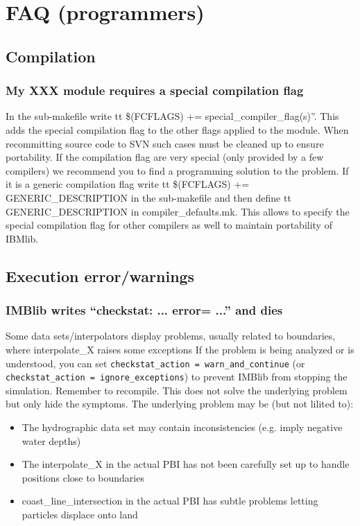 \chapter{FAQ (programmers)}

\section{Compilation}
   \subsection{My XXX module requires a special compilation flag}
   In the sub-makefile write {tt \$(FCFLAGS) += special\_compiler\_flag(s)}''.
   This adds the special compilation flag to the other flags applied
   to the module. 
   When recommitting source code to SVN such cases must be cleaned up to 
   ensure portability. If the compilation flag are very special (only provided by
   a few compilers) we recommend you to find a programming solution
   to the problem. If it is a generic compilation flag write 
   {tt \$(FCFLAGS) += GENERIC\_DESCRIPTION} in the sub-makefile and then
   define {tt GENERIC\_DESCRIPTION} in compiler\_defaults.mk. 
   This allows to specify the special compilation flag for other compilers
   as well to maintain portability of IBMlib.

\section{Execution error/warnings}
   \subsection{IMBlib writes ``checkstat: ... error= ...'' and dies}
   Some data sets/interpolators display problems, usually related to 
   boundaries, where interpolate\_X raises some exceptions
   If the problem is being analyzed or is understood, you 
   can set {\tt checkstat\_action = warn\_and\_continue} 
   (or {\tt checkstat\_action = ignore\_exceptions}) to prevent 
   IMBlib from stopping the simulation. Remember to recompile.
   This does not solve the underlying problem but only hide the symptoms. 
   The underlying problem may be (but not lilited to):
   \begin{itemize}
     \item  The hydrographic data set may contain inconsistencies
            (e.g. imply negative water depths)
     \item  The interpolate\_X in the actual PBI has not been carefully set up to 
            handle positions close to boundaries
     \item  coast\_line\_intersection in the actual PBI has subtle problems
            letting particles displace onto land
   \end{itemize}
   

